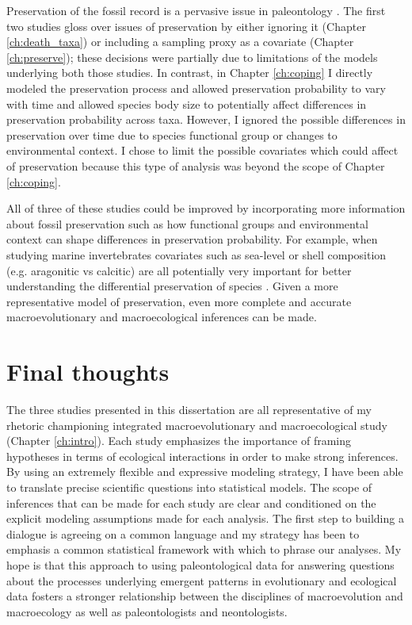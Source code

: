 Preservation of the fossil record is a pervasive issue in paleontology \citep{Foote1996e,Foote1997c,Foote1999a,Foote2001,Lloyd2011,Wang2016b}. The first two studies gloss over issues of preservation by either ignoring it (Chapter \ref{ch:death_taxa}) or including a sampling proxy as a covariate (Chapter \ref{ch:preserve}); these decisions were partially due to limitations of the models underlying both those studies. In contrast, in Chapter \ref{ch:coping} I directly modeled the preservation process and allowed preservation probability to vary with time and allowed species body size to potentially affect differences in preservation probability across taxa. However, I ignored the possible differences in preservation over time due to species functional group or changes to environmental context. I chose to limit the possible covariates which could affect of preservation because this type of analysis was beyond the scope of Chapter \ref{ch:coping}. 

All of three of these studies could be improved by incorporating more information about fossil preservation such as how functional groups and environmental context can shape differences in preservation probability. For example, when studying marine invertebrates covariates such as sea-level or shell composition (e.g. aragonitic vs calcitic) are all potentially very important for better understanding the differential preservation of species \citep{Foote2015b,Peters2002a,Peters2010,Hannisdal2011}. Given a more representative model of preservation, even more complete and accurate macroevolutionary and macroecological inferences can be made.



\section{Final thoughts}

The three studies presented in this dissertation are all representative of my rhetoric championing integrated macroevolutionary and macroecological study (Chapter \ref{ch:intro}). Each study emphasizes the importance of framing hypotheses in terms of ecological interactions in order to make strong inferences. By using an extremely flexible and expressive modeling strategy, I have been able to translate precise scientific questions into statistical models. The scope of inferences that can be made for each study are clear and conditioned on the explicit modeling assumptions made for each analysis. The first step to building a dialogue is agreeing on a common language and my strategy has been to emphasis a common statistical framework with which to phrase our analyses. My hope is that this approach to using paleontological data for answering questions about the processes underlying emergent patterns in evolutionary and ecological data fosters a stronger relationship between the disciplines of macroevolution and macroecology as well as paleontologists and neontologists.

